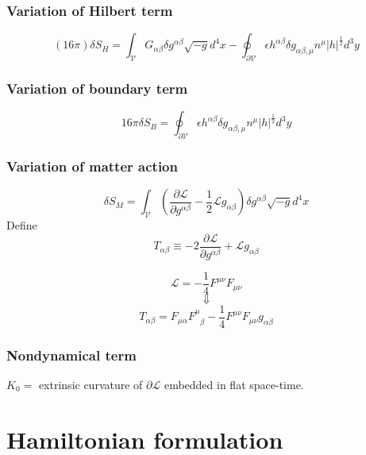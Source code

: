 \subsubsection{Variation of Hilbert term}
\[(16 \pi) \delta S_H = \int_{\mathcal{V}} G_{\alpha \beta} \delta g^{\alpha \beta} \sqrt{-g} d^4 x - \oint_{\partial \mathcal{V}} \epsilon h^{\alpha \beta} \delta g_{\alpha \beta, \mu} n^{\mu} |h|^{\frac{1}{2}} d^3 y\]
\subsubsection{Variation of boundary term}
\[16\pi \delta S_B = \oint_{\partial \mathcal{V}} \epsilon h^{\alpha \beta} \delta g_{\alpha \beta, \mu} n^{\mu} |h|^{\frac{1}{2}} d^3 y \]
\subsubsection{Variation of matter action}
\[\delta S_M = \int_{\mathcal{V}} \left( \frac{\partial \mathcal{L}}{\partial g^{\alpha \beta}} - \frac{1}{2} \mathcal{L} g_{\alpha \beta} \right) \delta g^{\alpha \beta} \sqrt{-g} d^4 x\]
Define
\[T_{\alpha \beta} \equiv -2 \frac{\partial \mathcal{L}}{\partial g^{\alpha \beta}} + \mathcal{L} g_{\alpha \beta}\]
\begin{example}
\[\mathcal{L} = -\frac{1}{4} F^{\mu \nu}F_{\mu \nu}\]
\[\Downarrow\]
\[T_{\alpha \beta} = F_{\mu \alpha} F^{\mu}_{\phantom{\mu} \beta} - \frac{1}{4} F^{\mu \nu} F_{\mu \nu} g_{\alpha \beta}\]
\end{example}
\subsubsection{Nondynamical term}
$K_0 = $ extrinsic curvature of $\partial \mathcal{L}$ embedded in flat space-time.

\section{Hamiltonian formulation}
